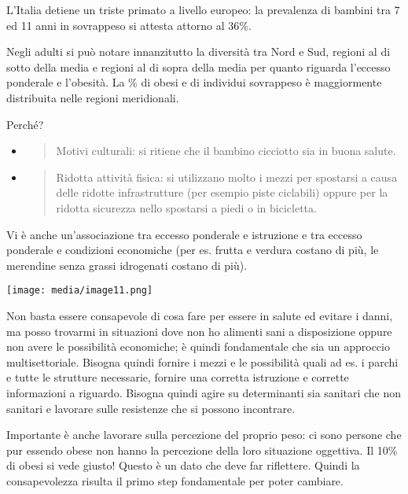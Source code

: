 \documentclass[]{article}
\begin{document}
L'Italia detiene un triste primato a livello europeo: la prevalenza di
bambini tra 7 ed 11 anni in sovrappeso si attesta attorno al 36\%.

Negli adulti si può notare innanzitutto la diversità tra Nord e Sud,
regioni al di sotto della media e regioni al di sopra della media per
quanto riguarda l'eccesso ponderale e l'obesità. La \% di obesi e di
individui sovrappeso è maggiormente distribuita nelle regioni
meridionali.

Perché?

\begin{itemize}
\item
  \begin{quote}
  Motivi culturali: si ritiene che il bambino cicciotto sia in buona
  salute.
  \end{quote}
\item
  \begin{quote}
  Ridotta attività fisica: si utilizzano molto i mezzi per spostarsi a
  causa delle ridotte infrastrutture (per esempio piste ciclabili)
  oppure per la ridotta sicurezza nello spostarsi a piedi o in
  bicicletta.
  \end{quote}
\end{itemize}

Vi è anche un'associazione tra eccesso ponderale e istruzione e tra
eccesso ponderale e condizioni economiche (per es. frutta e verdura
costano di più, le merendine senza grassi idrogenati costano di più).

\texttt{[image: media/image11.png]}

Non basta essere consapevole di cosa fare per essere in salute ed
evitare i danni, ma posso trovarmi in situazioni dove non ho alimenti
sani a disposizione oppure non avere le possibilità economiche; è quindi
fondamentale che sia un approccio multisettoriale. Bisogna quindi
fornire i mezzi e le possibilità quali ad es. i parchi e tutte le
strutture necessarie, fornire una corretta istruzione e corrette
informazioni a riguardo. Bisogna quindi agire su determinanti sia
sanitari che non sanitari e lavorare sulle resistenze che si possono
incontrare.

Importante è anche lavorare sulla percezione del proprio peso: ci sono
persone che pur essendo obese non hanno la percezione della loro
situazione oggettiva. Il 10\% di obesi si vede giusto! Questo è un dato
che deve far riflettere. Quindi la consapevolezza risulta il primo step
fondamentale per poter cambiare.
\end{document}
